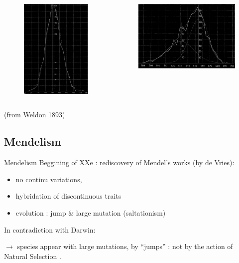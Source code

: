 \documentclass[8pt]{beamer}
\begin{document}
\begin{frame}{}
	\begin{columns}
	\begin{figure}[hbp]
		\begin{center}
			\includegraphics[width=4cm]{images/gauss1.png}
		\end{center}
	\end{figure}


	\begin{figure}[hbp]
		\begin{center}
			\includegraphics[width=6cm]{images/gauss2.png}
		\end{center}
	\end{figure}
\end{columns}
\begin{center}
	(from Weldon 1893)
\end{center}

\end{frame}


\subsection{Mendelism}
\begin{frame}{Mendelism}
	Beggining of XXe : rediscovery of Mendel's works (by de Vries):
	\vfill
	\begin{itemize}
		\item no continu variations,
		\item hybridation of discontinuous traits 
		\item evolution : jump \& large mutation (saltationism)
	\end{itemize}
	\vfill

	In contradiction with Darwin:

	$\rightarrow$ species appear with large mutations, by ``jumps'' : not by the action of Natural Selection .

	
\end{frame}
\end{document}
